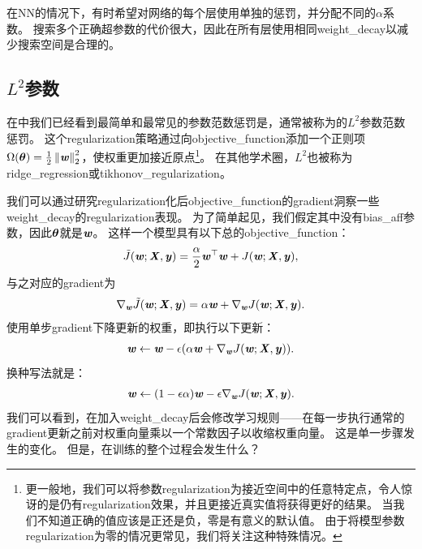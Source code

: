 在\gls{NN}的情况下，有时希望对网络的每个层使用单独的惩罚，并分配不同的$\alpha$系数。
搜索多个正确超参数的代价很大，因此在所有层使用相同\gls{weight_decay}以减少搜索空间是合理的。


\subsection{$L^2$参数}
\label{sec:l2_parameter_regularization}
在中我们已经看到最简单和最常见的参数范数惩罚是，通常被称为的$L^2$参数范数惩罚。
这个\gls{regularization}策略通过向\gls{objective_function}添加一个正则项$\Omega(\boldsymbol{\theta}) = \frac{1}{2} \left\lVert\boldsymbol{\mathit{w}}\right\rVert_2^2$，使权重更加接近原点\footnote{更一般地，我们可以将参数\gls{regularization}为接近空间中的任意特定点，令人惊讶的是仍有\gls{regularization}效果，并且更接近真实值将获得更好的结果。
当我们不知道正确的值应该是正还是负，零是有意义的默认值。
由于将模型参数\gls{regularization}为零的情况更常见，我们将关注这种特殊情况。}。
在其他学术圈，$L^2$也被称为\gls{ridge_regression}或\gls{tikhonov_regularization}。

我们可以通过研究\gls{regularization}化后\gls{objective_function}的\gls{gradient}洞察一些\gls{weight_decay}的\gls{regularization}表现。
为了简单起见，我们假定其中没有\gls{bias_aff}参数，因此$\boldsymbol{\theta}$就是$\boldsymbol{\mathit{w}}$。
这样一个模型具有以下总的\gls{objective_function}：
\begin{align}
  \tilde{J}(\boldsymbol{\mathit{w}};\boldsymbol{\mathit{X}}, \boldsymbol{\mathit{y}}) =\frac{\alpha}{2} \boldsymbol{\mathit{w}}^\top \boldsymbol{\mathit{w}} +  J(\boldsymbol{\mathit{w}};\boldsymbol{\mathit{X}}, \boldsymbol{\mathit{y}}),
\end{align}
与之对应的\gls{gradient}为
\begin{align}
 \nabla_{\boldsymbol{\mathit{w}}} \tilde{J}(\boldsymbol{\mathit{w}};\boldsymbol{\mathit{X}},\boldsymbol{\mathit{y}}) =\alpha \boldsymbol{\mathit{w}} +  \nabla_{\boldsymbol{\mathit{w}}} J(\boldsymbol{\mathit{w}};\boldsymbol{\mathit{X}}, \boldsymbol{\mathit{y}}).
\end{align}
使用单步\gls{gradient}下降更新的权重，即执行以下更新：
\begin{align}
 \boldsymbol{\mathit{w}} \leftarrow \boldsymbol{\mathit{w}} - \epsilon(\alpha \boldsymbol{\mathit{w}} + \nabla_{\boldsymbol{\mathit{w}}} J(\boldsymbol{\mathit{w}};\boldsymbol{\mathit{X}}, \boldsymbol{\mathit{y}})).
\end{align}
换种写法就是：
\begin{align}
 \boldsymbol{\mathit{w}} \leftarrow (1-\epsilon \alpha)\boldsymbol{\mathit{w}} - \epsilon \nabla_{\boldsymbol{\mathit{w}}} J(\boldsymbol{\mathit{w}};\boldsymbol{\mathit{X}}, \boldsymbol{\mathit{y}}).
\end{align}
我们可以看到，在加入\gls{weight_decay}后会修改学习规则——在每一步执行通常的\gls{gradient}更新之前对权重向量乘以一个常数因子以收缩权重向量。
这是单一步骤发生的变化。
但是，在训练的整个过程会发生什么？


